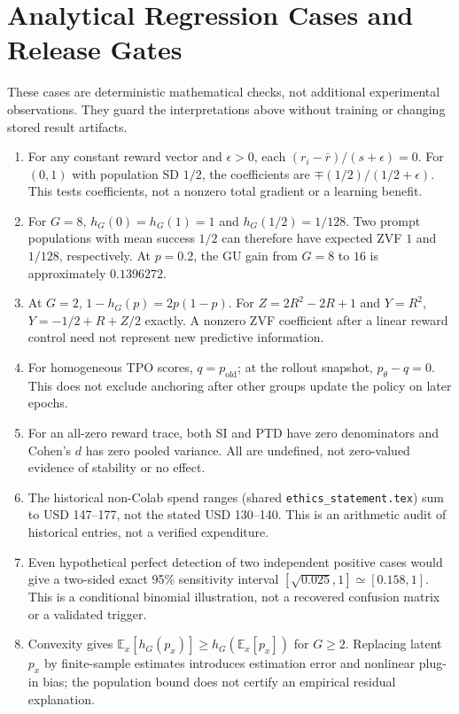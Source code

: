 \section{Analytical Regression Cases and Release Gates}
\label{app:audit-regressions}
These cases are deterministic mathematical checks, not additional experimental
observations. They guard the interpretations above without training or changing
stored result artifacts.
\begin{enumerate}
\item For any constant reward vector and $\epsilon>0$, each
$(r_i-\bar r)/(s+\epsilon)=0$. For $(0,1)$ with population SD $1/2$, the
coefficients are $\mp (1/2)/(1/2+\epsilon)$. This tests coefficients, not a
nonzero total gradient or a learning benefit.
\item For $G=8$, $h_G(0)=h_G(1)=1$ and $h_G(1/2)=1/128$.
Two prompt populations with mean success $1/2$ can therefore have expected
ZVF $1$ and $1/128$, respectively. At $p=0.2$, the GU gain from $G=8$ to
$16$ is approximately $0.1396272$.
\item At $G=2$, $1-h_G(p)=2p(1-p)$. For $Z=2R^2-2R+1$ and $Y=R^2$,
$Y=-1/2+R+Z/2$ exactly. A nonzero ZVF coefficient after a linear reward
control need not represent new predictive information.
\item For homogeneous TPO scores, $q=p_{\mathrm{old}}$; at the rollout snapshot,
$p_\theta-q=0$. This does not exclude anchoring after other groups update the
policy on later epochs.
\item For an all-zero reward trace, both SI and PTD have zero denominators and
Cohen's $d$ has zero pooled variance. All are undefined, not zero-valued evidence
of stability or no effect.
\item The historical non-Colab spend ranges (shared
\texttt{ethics\_statement.tex}) sum to USD 147--177, not the stated USD
130--140. This is an arithmetic audit of historical entries, not a verified
expenditure.
\item Even hypothetical perfect detection of two independent positive cases
would give a two-sided exact 95\% sensitivity interval
$[\sqrt{0.025},1]\simeq[0.158,1]$. This is a conditional binomial
illustration, not a recovered confusion matrix or a validated trigger.
\item Convexity gives $\mathbb E_x[h_G(p_x)]\ge h_G(\mathbb E_x[p_x])$
for $G\ge2$. Replacing latent $p_x$ by finite-sample estimates introduces
estimation error and nonlinear plug-in bias; the population bound does not
certify an empirical residual explanation.
\end{enumerate}

